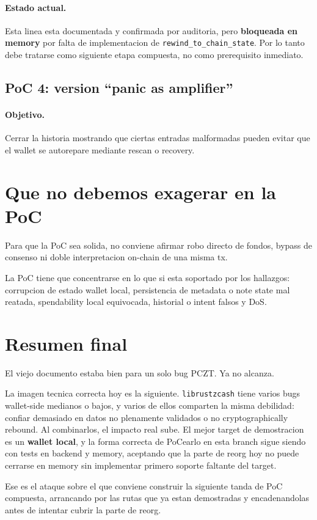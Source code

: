 \documentclass[11pt,a4paper]{article}
\begin{document}
\paragraph{Estado actual.}
Esta linea esta documentada y confirmada por auditoria, pero
\textbf{bloqueada en memory} por falta de implementacion de
\texttt{rewind\_to\_chain\_state}. Por lo tanto debe tratarse como siguiente
etapa compuesta, no como prerequisito inmediato.

\subsection{PoC 4: version ``panic as amplifier''}

\paragraph{Objetivo.}
Cerrar la historia mostrando que ciertas entradas malformadas pueden evitar
que el wallet se autorepare mediante rescan o recovery.

\section{Que no debemos exagerar en la PoC}

Para que la PoC sea solida, no conviene afirmar robo directo de fondos,
bypass de consenso ni doble interpretacion on-chain de una misma tx.

La PoC tiene que concentrarse en lo que si esta soportado por los hallazgos:
corrupcion de estado wallet local, persistencia de metadata o note state mal
reatada, spendability local equivocada, historial o intent falsos y DoS.

\section{Resumen final}

El viejo documento estaba bien para un solo bug PCZT. Ya no alcanza.

La imagen tecnica correcta hoy es la siguiente. \texttt{librustzcash} tiene
varios bugs wallet-side medianos o bajos, y varios de ellos comparten la misma
debilidad: confiar demasiado en datos no plenamente validados o no
cryptographically rebound. Al combinarlos, el impacto real sube. El mejor
target de demostracion es un \textbf{wallet local}, y la forma correcta de
PoCearlo en esta branch sigue siendo con tests en backend y memory, aceptando
que la parte de reorg hoy no puede cerrarse en memory sin implementar primero
soporte faltante del target.

Ese es el ataque sobre el que conviene construir la siguiente tanda de PoC
compuesta, arrancando por las rutas que ya estan demostradas y encadenandolas
antes de intentar cubrir la parte de reorg.
\end{document}
